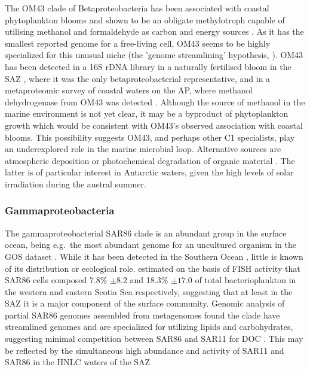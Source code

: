 The OM43 clade of Betaproteobacteria has been associated with coastal phytoplankton blooms \cite{Morris:2006hma} and shown to be an obligate methylotroph capable of utilising methanol and formaldehyde as carbon and energy sources \cite{Giovannoni:2008kw}.
As it has the smallest reported genome for a free-living cell, OM43 seems to be highly specialized for this unusual niche (the 'genome streamlining' hypothesis, \citet{Mira:2001ti}).
OM43 has been detected in a 16S rDNA library in a naturally fertilised bloom in the \ac{SAZ} \cite{West:2008kc}, where it was the only betaproteobacterial representative, and in a metaproteomic survey of coastal waters on the \ac{AP}, where methanol dehydrogenase from OM43 was detected \cite{Williams:2012bs}.
Although the source of methanol in the marine environment is not yet clear, it may be a byproduct of phytoplankton growth \cite{Heikes:2002ee} which would be consistent with OM43's observed association with coastal blooms.
This possibility suggests OM43, and perhaps other C1 specialists, play an underexplored role in the marine microbial loop.
Alternative sources are atmospheric deposition \cite{Sinha:2007uu} or photochemical degradation of organic material \cite{Dixon:2011er}.
The latter is of particular interest in Antarctic waters, given the high levels of solar irradiation during the austral summer.

\subsubsection{Gammaproteobacteria}


The gammaproteobacterial SAR86 clade is an abundant group in the surface ocean, being e.g.\ the most abundant genome for an uncultured organism in the \ac{GOS} dataset \cite{Dupont:2011fk}.
While it has been detected in the Southern Ocean \cite{Abell:2005ji,Topping:2006ul,West:2008kc,Obernosterer:2011df}, little is known of its distribution or ecological role.
\cite{Topping:2006ul} estimated on the basis of \ac{FISH} activity that SAR86 cells composed 7.8\% $\pm8.2$ and 18.3\% $\pm17.0$ of total bacterioplankton in the western and eastern Scotia Sea respectively, suggesting that at least in the SAZ it is a major component of the surface community.
Genomic analysis of partial SAR86 genomes assembled from metagenomes found the clade have streamlined genomes and are specialized for utilizing lipids and carbohydrates, suggesting minimal competition between SAR86 and SAR11 for \ac{DOC} \cite{Dupont:2011fk}.
This may be reflected by the simultaneous high abundance and activity of SAR11 and SAR86 in the \ac{HNLC} waters of the \ac{SAZ} \cite{Obernosterer:2011df}

